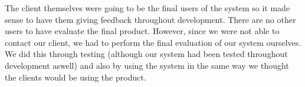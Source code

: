 \documentclass[11pt,a4paper]{article}
\begin{document}
The client themselves were going to be the final users of the system so it made sense to have them giving feedback throughout development. There are no other users to have evaluate the final product. However, since we were not able to contact our client, we had to perform the final evaluation of our system ourselves. We did this through testing (although our system had been tested throughout development aswell) and also by using the system in the same way we thought the clients would be using the product.
\end{document}

